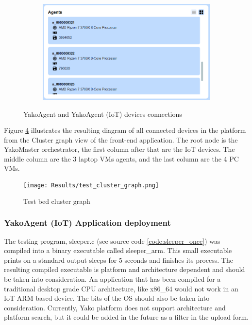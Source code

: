 \begin{figure}[H]
\begin{subfigure}{0.5\textwidth}
                \label{fig:test_agent_iot_connect}
            \end{subfigure}
            \begin{subfigure}{0.5\textwidth}
                \includegraphics[width=\textwidth]{Images/Results/test_agent_connect_2.png}
                \label{fig:test_agent_connect_2}
            \end{subfigure}
            \caption{YakoAgent and YakoAgent (IoT) devices connections}
            \label{fig:test_agents_connection}
        \end{figure}
        
        
        Figure \ref{fig:test_cluster_graph} illustrates the resulting diagram of all connected devices in the platform from the Cluster graph view of the front-end application. The root node is the YakoMaster orchestrator, the first column after that are the IoT devices. The middle column are the 3 laptop VMs agents, and the last column are the 4 PC VMs.
        
        \begin{figure}[H]
            \centering
            \texttt{[image: Results/test\_cluster\_graph.png]}
            \caption{Test bed cluster graph}
            \label{fig:test_cluster_graph}
        \end{figure}
        
        \subsubsection{YakoAgent (IoT) Application deployment}
            The testing program, sleeper.c (see source code \ref{code:sleeper_once}) was compiled into a binary executable called sleeper\_arm. This small executable prints on a standard output sleeps for 5 seconds and finishes its process. The resulting compiled executable is platform and architecture dependent and should be taken into consideration. An application that has been compiled for a traditional desktop grade CPU architecture, like x86\_64 would not work in an IoT ARM based device. The bits of the OS should also be taken into consideration. Currently, Yako platform does not support architecture and platform search, but it could be added in the future as a filter in the upload form.
            
